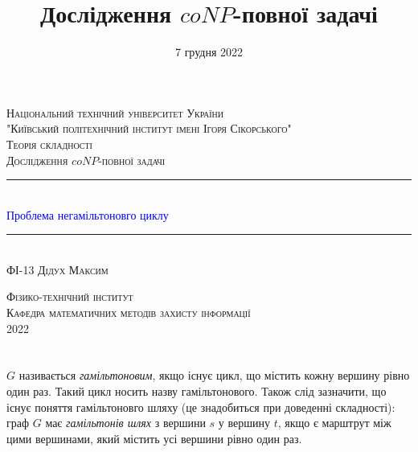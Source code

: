 \documentclass[14pt]{article}
\begin{document}
\begin{spacing}{1.175}	
	\begin{titlepage} 
		\newcommand{\HRule}{\rule{\linewidth}{0.3mm}}
		\center 
		
		\textsc{\large Національний технічний університет України
			\\"Київський політехнічний інститут імені Ігоря Сікорського"}\\[1.5cm]
		
		\vspace{5cm}
		\textsc{\large Теорія складності}\\[0.5cm]
		
		\textsc{\large Дослідження \(coNP\)-повної задачі}\\[0.5cm] 
		
		\HRule\\[0.4cm]
		
		{\huge \textcolor{blue}{Проблема негамільтоновго циклу}}\\[0.4cm]
		
		\HRule\\[1.5cm]
		\textsc{\large ФІ-13 Дідух Максим}\\[0.5cm]
		
		\vspace{7.5cm}
		
		\textsc{\large Фізико-технічний інститут}\\[0.5cm]
		\textsc{\large Кафедра математичних методів захисту інформації}\\[0.5cm]
		{\large {2022}} 
	\end{titlepage}
    
    
    
    \newpage
    \title{\Large Дослідження \(coNP\)-повної задачі}
    \date{\large 7 грудня 2022}
    \maketitle
    \tableofcontents                                                                            %
    \newpage
    \section{}
         \(G\) називається \textit{гамільтоновим}, якщо існує цикл, що містить кожну вершину рівно один раз. Такий цикл носить назву гамільтонового. Також слід зазначити, що існує поняття гамільтоновго шляху (це знадобиться при доведенні складності): граф \(G\) має \textit{гамільтонів шлях} з вершини \(s\) у вершину \(t\), якщо є марштрут між цими вершинами, який містить усі вершини рівно один раз.
        

\end{spacing}
\end{document}
